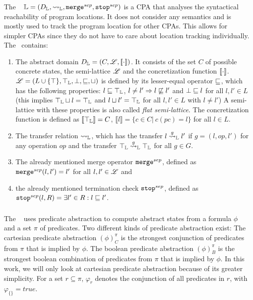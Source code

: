 \subsubsection{\LocationCPA}
The \locationCPA\ \cite{BeyerBook} $\mathbb{L} = (D_{\mathbb{L}}, \rightsquigarrow_{\mathbb{L}}, \texttt{merge}^{sep}, \texttt{stop}^{sep})$ is a CPA that analyses the syntactical reachability of program locations.
It does not consider any semantics and is mostly used to track the program location for other CPAs.
This allows for simpler CPAs since they do not have to care about location tracking individually.
The \locationCPA\ contains:
\begin{enumerate}[leftmargin=*, label=\arabic*.]
\item The abstract domain $D_{\mathbb{L}} = (C, \mathscr{L}, [\![ \cdot ]\!])$. It consists of the set  $C$ of possible concrete states, the semi-lattice $\mathscr{L}$ and the concretization function $[\![ \cdot ]\!]$.
	$\mathscr{L} = (L \cup \{\top\}, \top_{\mathbb{L}}, \bot, \sqsubseteq, \sqcup)$ is defined by its lesser-equal operator $\sqsubseteq$, which has the following properties:
	$l \sqsubseteq \top_{\mathbb{L}}$, $l \neq l' \Rightarrow l \not\sqsubseteq l'$ and $\bot \sqsubseteq l$ for all $l, l' \in L$
	(this implies $\top_{\mathbb{L}} \sqcup l = \top_{\mathbb{L}}$ and $l \sqcup l' = \top_{\mathbb{L}}$ for all $l, l' \in L$ with $l \neq l'$) A semi-lattice with 	these properties is also called \emph{flat semi-lattice}.
	The concretization function is defined as $[\![ \top_{\mathbb{L}} ]\!] = C$, $\llbracket l \rrbracket = \{ c \in C |\ c(pc) = l\}$ for all $l \in L$.
\item The transfer relation $\rightsquigarrow_{\mathbb{L}}$, which has the transfer $l \overset{g}{\rightsquigarrow}_{\mathbb{L}} l'$ if $g = (l, op, l')$ for any operation $op$
	and the transfer $\top_{\mathbb{L}} \overset{g}{\rightsquigarrow}_{\mathbb{L}} \top_{\mathbb{L}}$ for all $g \in G$.
\item The already mentioned merge operator $\texttt{merge}^{sep}$, defined as $\texttt{merge}^{sep}(l, l') = l'$ for all $l, l' \in \mathscr{L}$ and
\item the already mentioned termination check $\texttt{stop}^{sep}$, defined as $\texttt{stop}^{sep}(l, R) = \exists l' \in R : l \sqsubseteq l'$.
\end{enumerate}
\subsubsection{\PredicateCPA}
The \predicateCPA\ \cite{BeyerBook} uses predicate abstraction \cite{Ball2001} to compute abstract states from a formula $\phi$ and a set $\pi$ of predicates.
Two different kinds of predicate abstraction exist:
The cartesian predicate abstraction $(\phi)^{\pi}_C$ is the strongest conjunction of predicates from $\pi$ that is implied by $\phi$.
The boolean predicate abstraction $(\phi)^{\pi}_B$ is the strongest boolean combination of predicates from $\pi$ that is implied by $\phi$.
In this work, we will only look at cartesian predicate abstraction because of its greater simplicity.
For a set $r \subseteq \pi$, $\varphi_r$ denotes the conjunction of all predicates in $r$, with $\varphi_{\{\}} = true$.

